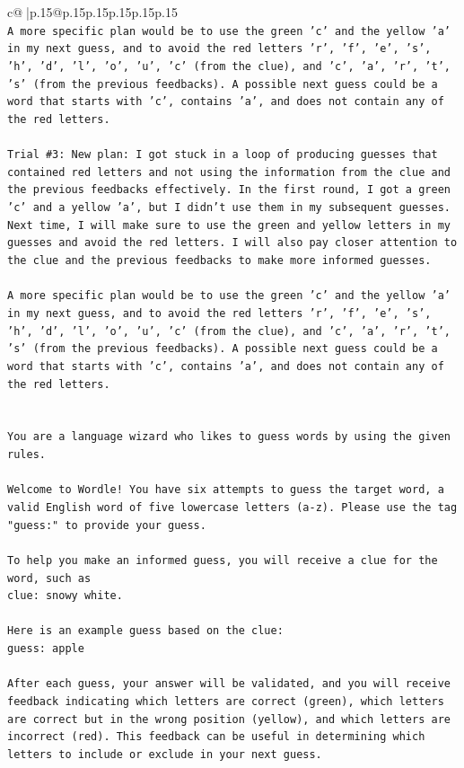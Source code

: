 \documentclass{article}
\begin{document}
{\begin{supertabular}{c@{$\;$}|p{.15\linewidth}@{}p{.15\linewidth}p{.15\linewidth}p{.15\linewidth}p{.15\linewidth}p{.15\linewidth}}
{{{\\ 
\texttt{A more specific plan would be to use the green 'c' and the yellow 'a' in my next guess, and to avoid the red letters 'r', 'f', 'e', 's', 'h', 'd', 'l', 'o', 'u', 'c' (from the clue), and 'c', 'a', 'r', 't', 's' (from the previous feedbacks). A possible next guess could be a word that starts with 'c', contains 'a', and does not contain any of the red letters.} \\
\\ 
\texttt{Trial \#3: New plan: I got stuck in a loop of producing guesses that contained red letters and not using the information from the clue and the previous feedbacks effectively. In the first round, I got a green 'c' and a yellow 'a', but I didn't use them in my subsequent guesses. Next time, I will make sure to use the green and yellow letters in my guesses and avoid the red letters. I will also pay closer attention to the clue and the previous feedbacks to make more informed guesses. } \\
\\ 
\texttt{A more specific plan would be to use the green 'c' and the yellow 'a' in my next guess, and to avoid the red letters 'r', 'f', 'e', 's', 'h', 'd', 'l', 'o', 'u', 'c' (from the clue), and 'c', 'a', 'r', 't', 's' (from the previous feedbacks). A possible next guess could be a word that starts with 'c', contains 'a', and does not contain any of the red letters.} \\
\\ 
\\ 
\texttt{You are a language wizard who likes to guess words by using the given rules.} \\
\\ 
\texttt{Welcome to Wordle! You have six attempts to guess the target word, a valid English word of five lowercase letters (a{-}z). Please use the tag "guess:" to provide your guess.} \\
\\ 
\texttt{To help you make an informed guess, you will receive a clue for the word, such as} \\
\texttt{clue: snowy white.} \\
\\ 
\texttt{Here is an example guess based on the clue: } \\
\texttt{guess: apple} \\
\\ 
\texttt{After each guess, your answer will be validated, and you will receive feedback indicating which letters are correct (green), which letters are correct but in the wrong position (yellow), and which letters are incorrect (red). This feedback can be useful in determining which letters to include or exclude in your next guess.} \\
}}}
\end{supertabular}}
\end{document}
